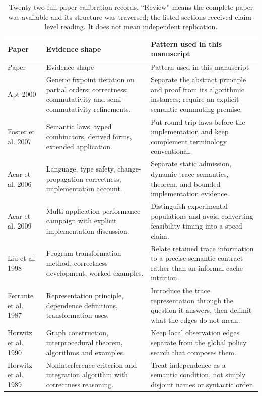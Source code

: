 \begin{longtable}{@{}p{}p{}p{}@{}}
\caption{Twenty-two full-paper calibration records.  ``Review'' means the complete
paper was available and its structure was traversed; the listed sections received
claim-level reading.  It does not mean independent replication.}\label{tab:calibration}\\
\toprule
Paper & Evidence shape & Pattern used in this manuscript \\
\midrule
\endfirsthead
\toprule
Paper & Evidence shape & Pattern used in this manuscript \\
\midrule
\endhead
Apt 2000 \cite{Apt2000} & Generic fixpoint iteration on partial orders; correctness; commutativity and semi-commutativity refinements. & Separate the abstract principle and proof from its algorithmic instances; require an explicit semantic commuting premise. \\
Foster et al. 2007 \cite{Foster2007} & Semantic laws, typed combinators, derived forms, extended application. & Put round-trip laws before the implementation and keep complement terminology conventional. \\
Acar et al. 2006 \cite{Acar2006} & Language, type safety, change-propagation correctness, implementation account. & Separate static admission, dynamic trace semantics, theorem, and bounded implementation evidence. \\
Acar et al. 2009 \cite{Acar2010} & Multi-application performance campaign with explicit implementation discussion. & Distinguish experimental populations and avoid converting feasibility timing into a speed claim. \\
Liu et al. 1998 \cite{Liu1998} & Program transformation method, correctness development, worked examples. & Relate retained trace information to a precise semantic contract rather than an informal cache intuition. \\
Ferrante et al. 1987 \cite{Ferrante1987} & Representation principle, dependence definitions, transformation uses. & Introduce the trace representation through the question it answers, then delimit what the edges do not mean. \\
Horwitz et al. 1990 \cite{Horwitz1990} & Graph construction, interprocedural theorem, algorithms and examples. & Keep local observation edges separate from the global policy search that composes them. \\
Horwitz et al. 1989 \cite{Horwitz1989} & Noninterference criterion and integration algorithm with correctness reasoning. & Treat independence as a semantic condition, not simply disjoint names or syntactic order. \\

\end{longtable}
